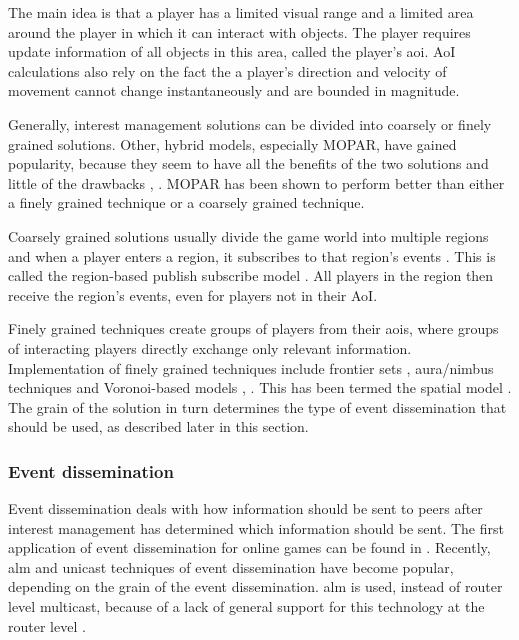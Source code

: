 \documentclass[10pt,a4paper,journal,cspaper,compsoc]{IEEEtran}
\begin{document}
The main idea is that a player has a limited visual range and a limited area around the player in which it can interact with objects. The player
requires update information of all objects in this area, called the player's \ac{aoi}. AoI calculations also rely on the fact the a player's
direction and velocity of movement cannot change instantaneously and are bounded in magnitude.

Generally, interest management solutions can be divided into coarsely or finely grained solutions. Other, hybrid models, especially MOPAR, have
gained popularity, because they seem to have all the benefits of the two solutions and little of the drawbacks \cite{hybrid_IM}, \cite{MOPAR}. MOPAR
has been shown to perform better than either a finely grained technique or a coarsely grained technique.

Coarsely grained solutions usually divide the game world into multiple regions and when a player enters a region, it subscribes to that region's
events \cite{mercury_publish_subscribe}. This is called the region-based publish subscribe model \cite{Fan_deisgn_issues_p2p}. All players in the
region then receive the region's events, even for players not in their AoI.

Finely grained techniques create groups of players from their \acp{aoi}, where groups of interacting players directly exchange only relevant
information. Implementation of finely grained techniques include frontier sets \cite{IM_frontier_sets}, aura/nimbus techniques
\cite{Benford_spatial_IM} and Voronoi-based models \cite{Hu_voronoi_IM}, \cite{Buyukkaya_voronoi_state_management}. This has been termed the spatial
model \cite{Fan_deisgn_issues_p2p}. The grain of the solution in turn determines the type of event dissemination that should be used, as described
later in this section.

\subsubsection{Event dissemination}

Event dissemination deals with how information should be sent to peers after interest management has determined which information should be sent. The
first application of event dissemination for online games can be found in \cite{first_GED}. Recently, \ac{alm} and unicast techniques of event
dissemination have become popular, depending on the grain of the event dissemination. \ac{alm} is used, instead of router level multicast, because of
a lack of general support for this technology at the router level \cite{ip_multicast_deployment_issues}.
\end{document}
